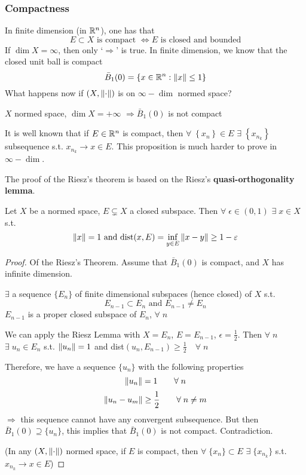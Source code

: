 \subsubsection*{Compactness}
In finite dimension (in \(\mathbb{R}^n\)), one has that
\[
    E \subset X \mbox{ is compact } \Leftrightarrow E \mbox{ is closed and bounded}
\]
If \(\dim X = \infty\), then only `\(\Rightarrow\)' is true. In finite dimension, we know that the closed unit ball is compact
\[
    \bar{B}_1(0) = \left\{ x \in \mathbb{R}^n : \norm{x} \leq 1\right\}
\]
What happens now if \((X, \norm{\cdot})\) is on \(\infty-\dim\) normed space?
\begin{theorem}
    \(X\) normed space, \(\dim X = +\infty\) \(\Rightarrow \bar{B}_1(0)\) is not compact
\end{theorem}
\begin{remark}
    It is well known that if \(E \in \mathbb{R}^n\) is compact, then \(\forall \; \left\{ x_n \right\} \in E \) \(\exists \; \left\{ x_{n_k} \right\}\) subsequence s.t. \(x_{n_k} \to x \in E\).  
    This proposition is much harder to prove in \(\infty-\dim\).
\end{remark}
The proof of the Riesz's theorem is based on the Riesz's \textbf{quasi-orthogonality lemma}.
\begin{lemma}
    Let \(X\) be a normed space, \(E \subsetneq X\) a closed subspace. 
    Then \(\forall \; \epsilon \in (0,1)\) \(\exists \; x \in X\) s.t.
    \[
        \norm{x}=1 \text{ and dist}(x, E) = \inf_{y \in E} \norm{x-y} \geq 1- \varepsilon
    \]
\end{lemma}
\begin{proof}
    Of the Riesz's Theorem. Assume that \(\bar{B}_1(0)\) is compact, and \(X \) has infinite dimension. 

    \(\exists\) a sequence \(\{E_n\}\) of finite dimensional subspaces (hence closed) of \(X\) s.t. 
    \[
        E_{n-1} \subset E_n \text{ and } E_{n-1} \neq E_n
    \]
    \(E_{n-1}\) is a proper closed subspace of \(E_n\), \(\forall\; n\)

    We can apply the Riesz Lemma with \(X = E_n\), \(E=E_{n-1}\), \(\epsilon=\frac{1}{2}\). 
    Then \(\forall \; n\) \(\exists \; u_n \in E_n  \) s.t. \(\norm{u_n}=1\) and dist\((u_n, E_{n-1}) \geq \frac{1}{2} \quad \forall\; n\)
    
    Therefore, we have a sequence \(\{u_n\}\) with the following properties 
    \[
        \norm{u_n}=1 \qquad \forall\; n
    \]
    \[
        \norm{u_n-u_m} \geq \frac{1}{2} \qquad \forall\; n \neq m
    \]
    \(\Rightarrow\) this sequence cannot have any convergent subsequence. 
    But then \(\bar{B}_1(0) \supseteq \{u_n\}\), this implies that \(\bar{B}_1(0)\) is not compact.
    Contradiction.

    (In any \(\left(X, \norm{\cdot}\right)\) normed space, if \(E\) is compact, 
    then \(\forall\; \{x_n\} \subset E \) \(\exists \; \{x_{n_k}\}\) s.t. \(x_{n_k} \rightarrow x \in E\))
\end{proof}